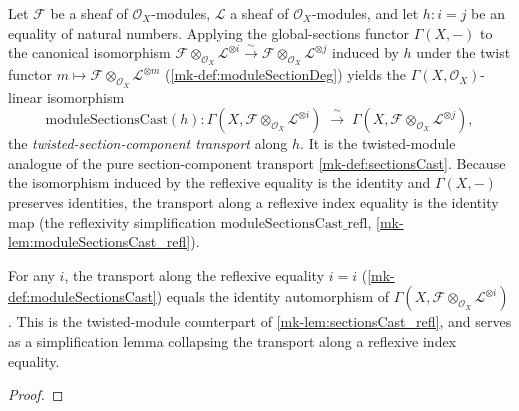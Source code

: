 \begin{definition}\label{mk-def:moduleSectionsCast}
  \leanok

  Let \(\mathcal{F}\) be a sheaf of \(\mathcal{O}_X\)-modules, \(\mathcal{L}\) a sheaf
  of \(\mathcal{O}_X\)-modules, and let \(h : i = j\) be an equality of natural
  numbers. Applying the global-sections functor \(\Gamma(X,-)\) to the canonical
  isomorphism
  \(\mathcal{F} \otimes_{\mathcal{O}_X} \mathcal{L}^{\otimes i}
    \xrightarrow{\sim}
    \mathcal{F} \otimes_{\mathcal{O}_X} \mathcal{L}^{\otimes j}\)
  induced by \(h\) under the twist functor
  \(m \mapsto \mathcal{F} \otimes_{\mathcal{O}_X} \mathcal{L}^{\otimes m}\)
  (\ref{mk-def:moduleSectionDeg}) yields the \(\Gamma(X,\mathcal{O}_X)\)-linear
  isomorphism
  \[
    \mathrm{moduleSectionsCast}(h) :
    \Gamma(X, \mathcal{F} \otimes_{\mathcal{O}_X} \mathcal{L}^{\otimes i})
      \;\xrightarrow{\ \sim\ }\;
    \Gamma(X, \mathcal{F} \otimes_{\mathcal{O}_X} \mathcal{L}^{\otimes j}),
  \]
  the \emph{twisted-section-component transport} along \(h\). It is the
  twisted-module analogue of the pure section-component transport
  \ref{mk-def:sectionsCast}. Because the isomorphism induced by the reflexive equality
  is the identity and \(\Gamma(X,-)\) preserves identities, the transport along a
  reflexive index equality is the identity map (the reflexivity simplification
  \(\mathrm{moduleSectionsCast\_refl}\), \ref{mk-lem:moduleSectionsCast_refl}).
\end{definition}

\begin{lemma}\label{mk-lem:moduleSectionsCast_refl}
  \leanok

  For any \(i\), the transport along the reflexive equality \(i = i\)
  (\ref{mk-def:moduleSectionsCast}) equals the identity automorphism of
  \(\Gamma(X, \mathcal{F} \otimes_{\mathcal{O}_X} \mathcal{L}^{\otimes i})\). This is
  the twisted-module counterpart of \ref{mk-lem:sectionsCast_refl}, and serves as a
  simplification lemma collapsing the transport along a reflexive index equality.
\end{lemma}

\begin{proof}
  \leanok\end{proof}

